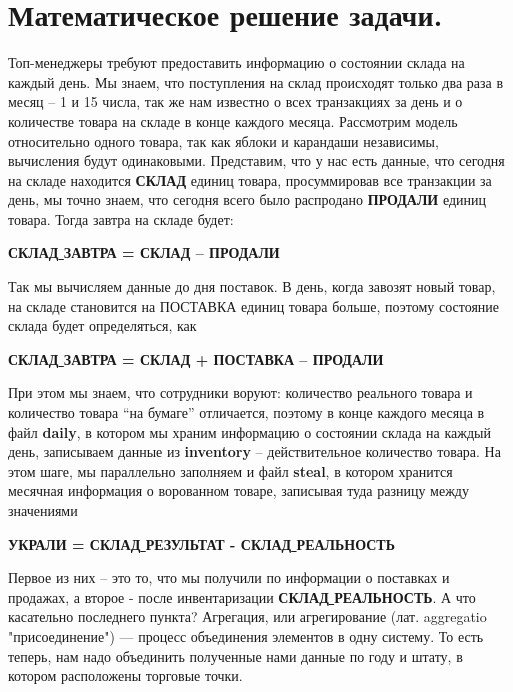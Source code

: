 \documentclass{article}
\begin{document}
\section{Математическое решение задачи.}
Топ-менеджеры требуют предоставить информацию о состоянии склада на каждый день.  
Мы знаем, что поступления на склад происходят только два раза в месяц – 1 и 15 числа, 
так же нам известно о всех транзакциях за день и о количестве товара на складе в конце каждого месяца. Рассмотрим модель относительно одного товара, так как яблоки и карандаши независимы, 
вычисления будут одинаковыми. 
\newline Представим, что у нас есть данные, что сегодня на складе находится \newline\textbf{СКЛАД} единиц товара, просуммировав все транзакции за день, 
мы точно знаем, что сегодня всего было распродано \textbf{ПРОДАЛИ} единиц товара. 
Тогда завтра на складе будет: 
\begin{center}
\textbf{СКЛАД\underline{ }ЗАВТРА = СКЛАД – ПРОДАЛИ}
\end{center}
Так мы вычисляем данные до дня поставок. 
В день, когда завозят новый товар, на складе становится на ПОСТАВКА единиц товара больше, 
поэтому состояние склада будет определяться, как 
\begin{center}
\textbf{СКЛАД\underline{ }ЗАВТРА = СКЛАД + ПОСТАВКА – ПРОДАЛИ}
\end{center}
При этом мы знаем, что сотрудники воруют: 
количество реального товара и количество товара “на бумаге” отличается, 
поэтому в конце каждого месяца в файл \textbf{daily}, 
в котором мы храним информацию о состоянии склада на каждый день, 
записываем данные из \textbf{inventory} – действительное количество товара. 
На этом шаге, мы параллельно заполняем и файл \textbf{steal}, 
в котором хранится месячная информация о ворованном товаре, записывая туда разницу между значениями 
\begin{center}
\textbf{УКРАЛИ = СКЛАД\underline{ }РЕЗУЛЬТАТ - СКЛАД\underline{ }РЕАЛЬНОСТЬ}
\end{center}
Первое из них – это то, что мы получили по информации о поставках и продажах, 
а второе - после инвентаризации \textbf{СКЛАД\underline{ }РЕАЛЬНОСТЬ}. 
\newline А что касательно последнего пункта? Агрегация, или агрегирование 
(лат. aggregatio "присоединение") — процесс объединения элементов в одну систему. 
То есть теперь, нам надо объединить полученные нами данные по году и штату, 
в котором расположены торговые точки. 
\end{document}
